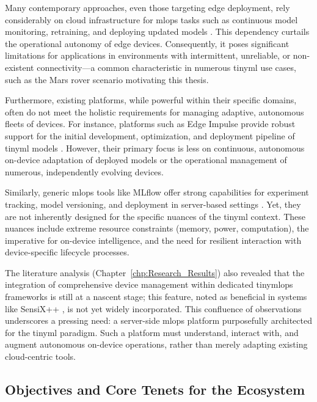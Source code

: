 Many contemporary approaches, even those targeting edge deployment, rely considerably on cloud infrastructure for \gls{mlops} tasks such as continuous model monitoring, retraining, and deploying updated models \cite{kreuzbergerMachineLearningOperations2023, antoniniTinyMLOpsFrameworkOrchestrating2022}. This dependency curtails the operational autonomy of edge devices. Consequently, it poses significant limitations for applications in environments with intermittent, unreliable, or non-existent connectivity—a common characteristic in numerous \gls{tinyml} use cases, such as the Mars rover scenario motivating this thesis.

Furthermore, existing platforms, while powerful within their specific domains, often do not meet the holistic requirements for managing adaptive, autonomous fleets of devices. For instance, platforms such as Edge Impulse provide robust support for the initial development, optimization, and deployment pipeline of \gls{tinyml} models \cite{banburyEdgeImpulseMLOps2023}. However, their primary focus is less on continuous, autonomous on-device adaptation of deployed models or the operational management of numerous, independently evolving devices.

Similarly, generic \gls{mlops} tools like MLflow offer strong capabilities for experiment tracking, model versioning, and deployment in server-based settings \cite{johnMLOpsFrameworkMaturity2021}. Yet, they are not inherently designed for the specific nuances of the \gls{tinyml} context. These nuances include extreme resource constraints (memory, power, computation), the imperative for on-device intelligence, and the need for resilient interaction with device-specific lifecycle processes.

The literature analysis (Chapter~\ref{chp:Research_Results}) also revealed that the integration of comprehensive device management within dedicated \gls{tinymlops} frameworks is still at a nascent stage; this feature, noted as beneficial in systems like SensiX++ \cite{minSensiXBringingMLOps2023}, is not yet widely incorporated. This confluence of observations underscores a pressing need: a server-side \gls{mlops} platform purposefully architected for the \gls{tinyml} paradigm. Such a platform must understand, interact with, and augment autonomous on-device operations, rather than merely adapting existing cloud-centric tools.

\subsection{Objectives and Core Tenets for the Ecosystem}
\label{ssec:framework_derived_objectives}

